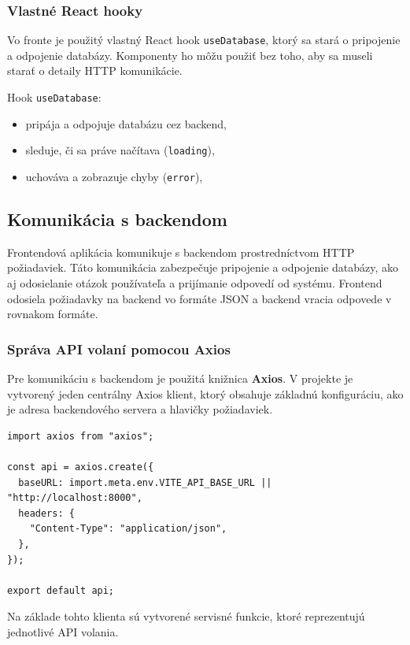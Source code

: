 \documentclass[a4paper, 12pt]{article}
\begin{document}
\subsubsection{Vlastné React hooky}

Vo fronte je použitý vlastný React hook \texttt{useDatabase}, ktorý sa stará o pripojenie a odpojenie databázy. Komponenty ho môžu použiť bez toho, aby sa museli starať o detaily HTTP komunikácie.  

Hook \texttt{useDatabase}:
\begin{itemize}
    \item pripája a odpojuje databázu cez backend,
    \item sleduje, či sa práve načítava (\texttt{loading}),
    \item uchováva a zobrazuje chyby (\texttt{error}),
\end{itemize}


\subsection{Komunikácia s backendom}

Frontendová aplikácia komunikuje s backendom prostredníctvom HTTP požiadaviek. 
Táto komunikácia zabezpečuje pripojenie a odpojenie databázy, ako aj odosielanie otázok používateľa a prijímanie odpovedí od systému. Frontend odosiela požiadavky na backend vo formáte JSON a backend vracia odpovede v rovnakom formáte.

\subsubsection{Správa API volaní pomocou Axios}

Pre komunikáciu s backendom je použitá knižnica \textbf{Axios}. 
V projekte je vytvorený jeden centrálny Axios klient, ktorý obsahuje základnú konfiguráciu, ako je adresa backendového servera a hlavičky požiadaviek.

\begin{lstlisting}[caption={Základná konfigurácia Axios klienta}]
import axios from "axios";

const api = axios.create({
  baseURL: import.meta.env.VITE_API_BASE_URL || "http://localhost:8000",
  headers: {
    "Content-Type": "application/json",
  },
});

export default api;
\end{lstlisting}

Na základe tohto klienta sú vytvorené servisné funkcie, ktoré reprezentujú jednotlivé API volania.
\end{document}
